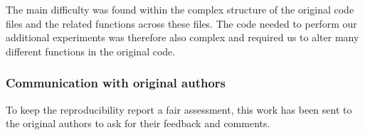 The main difficulty was found within the complex structure of the original code files and the related functions across these files. The code needed to perform our additional experiments was therefore also complex and required us to alter many different functions in the original code.

\subsubsection*{Communication with original authors}

To keep the reproducibility report a fair assessment, this work has been sent to the original authors to ask for their feedback and comments. 